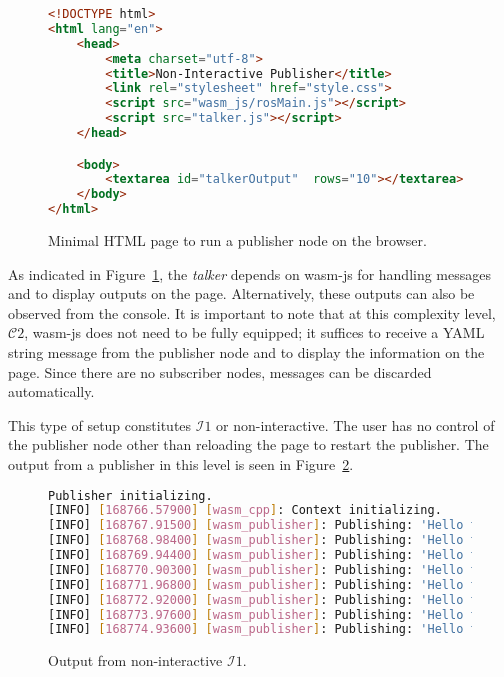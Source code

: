         \begin{figure}[htbp]
            \begin{lstlisting}[language=html]
<!DOCTYPE html>
<html lang="en">
    <head>
        <meta charset="utf-8">
        <title>Non-Interactive Publisher</title>
        <link rel="stylesheet" href="style.css">
        <script src="wasm_js/rosMain.js"></script>
        <script src="talker.js"></script>
    </head>

    <body>
        <textarea id="talkerOutput"  rows="10"></textarea>
    </body>
</html>
\end{lstlisting}
            \caption{Minimal \ac{HTML} page to run a publisher node on the browser.}
            \label{fig:html}
        \end{figure}

        As indicated in Figure~\ref{fig:html}, the \textit{talker} depends on \textsf{wasm-js} for handling messages and to display outputs on the page. Alternatively, these outputs can also be observed from the console. It is important to note that at this complexity level, $\mathcal{C}2$, \textsf{wasm-js} does not need to be fully equipped; it suffices to receive a \ac{YAML} string message from the publisher node and to display the information on the page. Since there are no subscriber nodes, messages can be discarded automatically.
        
        This type of setup constitutes $\mathcal{I}1$ or non-interactive. The user has no control of the publisher node other than reloading the page to restart the publisher. The output from a publisher in this level is seen in Figure~\ref{fig:ui1}. 

        \begin{figure}[htbp]
            \centering

            \begin{lstlisting}[language=Bash]
Publisher initializing.
[INFO] [168766.57900] [wasm_cpp]: Context initializing.
[INFO] [168767.91500] [wasm_publisher]: Publishing: 'Hello there! 0'
[INFO] [168768.98400] [wasm_publisher]: Publishing: 'Hello there! 1'
[INFO] [168769.94400] [wasm_publisher]: Publishing: 'Hello there! 2'
[INFO] [168770.90300] [wasm_publisher]: Publishing: 'Hello there! 3'
[INFO] [168771.96800] [wasm_publisher]: Publishing: 'Hello there! 4'
[INFO] [168772.92000] [wasm_publisher]: Publishing: 'Hello there! 5'
[INFO] [168773.97600] [wasm_publisher]: Publishing: 'Hello there! 6'
[INFO] [168774.93600] [wasm_publisher]: Publishing: 'Hello there! 7'
\end{lstlisting}
            \caption{Output from non-interactive $\mathcal{I}1$.}\label{fig:ui1}
        \end{figure}

